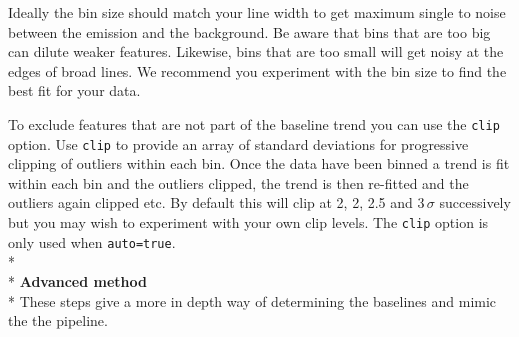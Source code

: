 \documentclass[twoside,11pt]{article}
\renewcommand{\_}{\texttt{\symbol{95}}}
\newcommand{\param}[1]{\texttt{#1}}
\begin{document}
Ideally the bin size should match your line width to get maximum single to noise between the emission and the background. Be aware that bins that are too big can dilute weaker features. Likewise, bins that are too small will get noisy at the edges of broad lines. We recommend you experiment with the bin size to find the best fit for your data.

To exclude features that are not part of the baseline trend you can use the \param{clip} option. Use \param{clip} to provide an array of standard deviations for progressive clipping of outliers within each bin. Once the data have been binned a trend is fit within each bin and the outliers clipped, the trend is then re-fitted and the outliers again clipped etc. By default this will clip at 2, 2, 2.5 and 3\,$\sigma$ successively but you may wish to experiment with your own clip levels. The \param{clip} option is only used when \param{auto=true}.
\\*\\*
\textbf{Advanced method}\\*
These steps give a more in depth way of determining the baselines and mimic the the pipeline.
\end{document}

